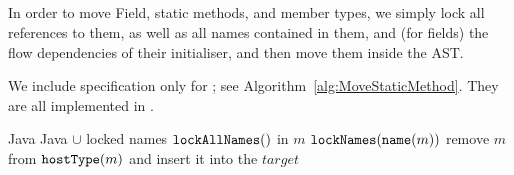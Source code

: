 \subsection{}
In order to move Field, static methods, and member types, we simply lock all references to them, as well as all names contained in them, and (for fields) the flow dependencies of their initialiser, and then move them inside the AST.

We include specification only for ; see Algorithm~\ref{alg:MoveStaticMethod}. 
They are all implemented in .


\begin{algorithm}[p]
\caption{$\refactoring{Move Static Method}(m : \type{StaticMethod}, target : \type{Type})$}\label{alg:MoveStaticMethod}
\begin{algorithmic}[1]
\REQUIRE Java
\ENSURE Java $\cup$ locked names
\medskip
  \STATE $\text{\texttt{lockAllNames}}()$ in $m$
  \STATE $\text{\texttt{lockNames}}(\text{\texttt{name}}(m))$
  \STATE remove $m$ from $\text{\texttt{hostType}}(m)$ and insert it into the $target$
\end{algorithmic}
\end{algorithm}




